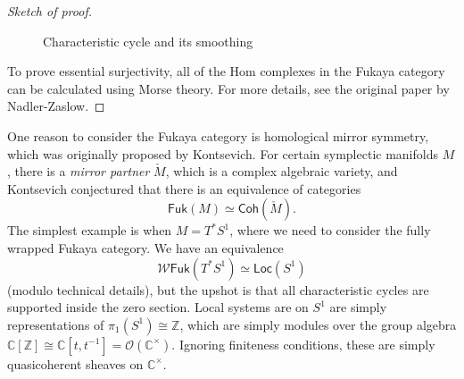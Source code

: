 \documentclass{amsart}
\theoremstyle{definition}
\theoremstyle{remark}
\theoremstyle{plain}
\theoremstyle{definition}
\theoremstyle{remark}
\newcommand{\C}{\mathbb{C}}
\newcommand{\Z}{\mathbb{Z}}
\renewcommand{\b}{\mathfrak{b}}
\newcommand{\mc}[1]{\mathcal{#1}}
\newcommand{\ms}[1]{\mathsf{#1}}
\newcommand{\1}{\mathbf{1}}
\newcommand{\2}{\mathbf{2}}
\newcommand{\3}{\mathbf{3}}
\begin{document}
\begin{proof}[Sketch of proof]
\begin{figure}[htpb]
\begin{center}
    \end{center}
    \caption{Characteristic cycle and its smoothing}%
    \label{fig:charcycle_smoothing}
    \end{figure}
    

    To prove essential surjectivity, all of the Hom complexes in the Fukaya category can be calculated using Morse theory. For more details, see the original paper by Nadler-Zaslow.
\end{proof}

One reason to consider the Fukaya category is homological mirror symmetry, which was originally proposed by Kontsevich. For certain symplectic manifolds \(M\), there is a \textit{mirror partner} \(\check{M}\), which is a complex algebraic variety, and Kontsevich conjectured that there is an equivalence of categories
\[ \ms{Fuk}(M) \simeq \ms{Coh}(\check{M}). \]
The simplest example is when \(M = T^* S^1\), where we need to consider the fully wrapped Fukaya category. We have an equivalence
\[ \mc{W}\ms{Fuk}(T^* S^1) \simeq \ms{Loc}(S^1) \]
(modulo technical details), but the upshot is that all characteristic cycles are supported inside the zero section. Local systems are on \(S^1\) are simply representations of \(\pi_1(S^1) \cong \Z\), which are simply modules over the group algebra \(\C[\Z] \cong \C[t, t^{-1}] = \mc{O}(\C^{\times})\). Ignoring finiteness conditions, these are simply quasicoherent sheaves on \(\C^{\times}\).
\end{document}
